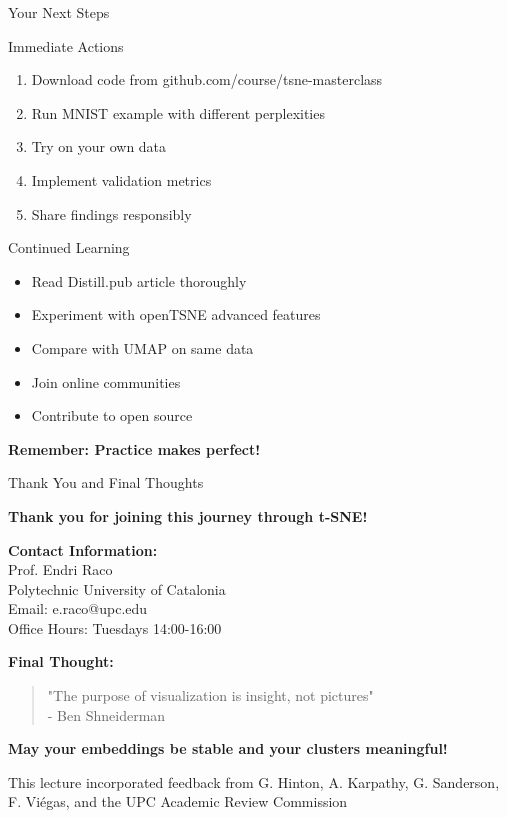 \documentclass[aspectratio=169]{beamer}
\begin{document}
\begin{frame}{Your Next Steps}
\begin{block}{Immediate Actions}
\begin{enumerate}
\item Download code from github.com/course/tsne-masterclass
\item Run MNIST example with different perplexities
\item Try on your own data
\item Implement validation metrics
\item Share findings responsibly
\end{enumerate}
\end{block}

\begin{block}{Continued Learning}
\begin{itemize}
\item Read Distill.pub article thoroughly
\item Experiment with openTSNE advanced features
\item Compare with UMAP on same data
\item Join online communities
\item Contribute to open source
\end{itemize}
\end{block}

\vspace{0.2cm}
\colorbox{green!30}{\parbox{0.9\textwidth}{\centering\textbf{Remember: Practice makes perfect!}}}
\end{frame}

\begin{frame}{Thank You and Final Thoughts}
\begin{center}
\Large\textbf{Thank you for joining this journey through t-SNE!}
\end{center}

\vspace{0.5cm}
\textbf{Contact Information:}\\
Prof. Endri Raco\\
Polytechnic University of Catalonia\\
Email: e.raco@upc.edu\\
Office Hours: Tuesdays 14:00-16:00

\vspace{0.5cm}
\textbf{Final Thought:}
\begin{quote}
"The purpose of visualization is insight, not pictures"\\
\hfill - Ben Shneiderman
\end{quote}

\vspace{0.5cm}
\begin{center}
\colorbox{blue!30}{\parbox{0.8\textwidth}{\centering\textbf{May your embeddings be stable and your clusters meaningful!}}}
\end{center}

\vspace{0.3cm}
\small
This lecture incorporated feedback from G. Hinton, A. Karpathy, G. Sanderson,\\
F. Viégas, and the UPC Academic Review Commission
\end{frame}
\end{document}

